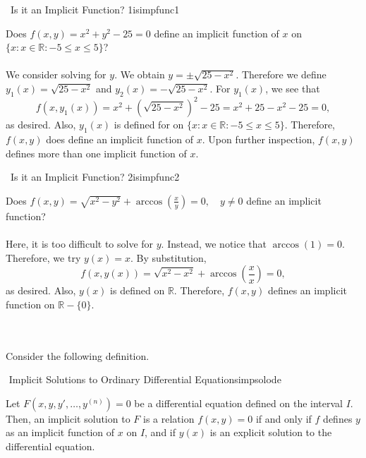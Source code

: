         \begin{example}{\Difficulty\,\Difficulty\,\,Is it an Implicit Function? 1}{isimpfunc1}
            
            Does \(f(x,y)=x^2+y^2-25=0\) define an implicit function of \(x\) on \(\{x:x\in\mathbb{R}:-5\leq x\leq 5\}\)?
            \\
            \\
            We consider solving for \(y\). We obtain \(y=\pm\sqrt{25-x^2}\). Therefore we define \(y_1(x)=\sqrt{25-x^2}\) and \(y_2(x)=-\sqrt{25-x^2}\). For \(y_1(x)\), we see that
            \begin{equation*}
                f(x,y_1(x))=x^2+(\sqrt{25-x^2})^2-25=x^2+25-x^2-25=0,
            \end{equation*}
            as desired. Also, \(y_1(x)\) is defined for on \(\{x:x\in\mathbb{R}:-5\leq x\leq 5\}\). Therefore, \(f(x,y)\) does define an implicit function of \(x\). Upon further inspection, \(f(x,y)\) defines more than one implicit function of \(x\).

        \end{example}
        \pagebreak
        \begin{example}{\Difficulty\,\Difficulty\,\,Is it an Implicit Function? 2}{isimpfunc2}
            
            Does \(f(x,y)=\sqrt{x^2-y^2}+\arccos\left(\frac{x}{y}\right)=0,\quad y\neq0\) define an implicit function?
            \\
            \\
            Here, it is too difficult to solve for \(y\). Instead, we notice that \(\arccos(1)=0\). Therefore, we try \(y(x)=x\). By substitution,
            \begin{equation*}
                f(x,y(x))=\sqrt{x^2-x^2}+\arccos\left(\frac{x}{x}\right)=0,
            \end{equation*}
            as desired. Also, \(y(x)\) is defined on \(\mathbb{R}\). Therefore, \(f(x,y)\) defines an implicit function on \(\mathbb{R}-\{0\}\).

        \end{example}
        \vphantom
        \\
        \\
        Consider the following definition.
        \begin{definition}{\Stop\,\,Implicit Solutions to Ordinary Differential Equations}{impsolode}
            
            Let \(F(x,y,y',\ldots,y^{(n)})=0\) be a differential equation defined on the interval \(I\). Then, an implicit solution to \(F\) is a relation \(f(x,y)=0\) if and only if \(f\) defines \(y\) as an implicit function of \(x\) on \(I\), and if \(y(x)\) is an explicit solution to the differential equation.

        \end{definition}
